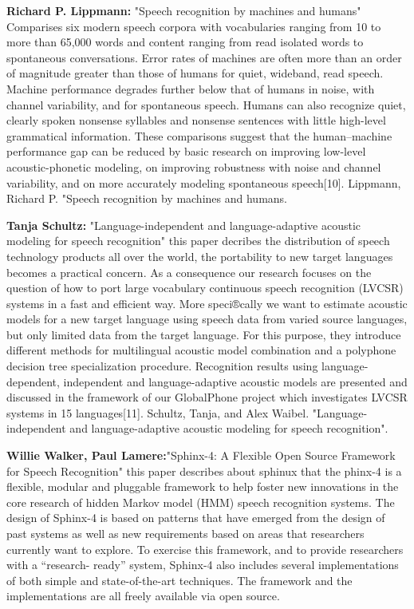 \documentclass[12pt,a4paper,oldfontcommands]{memoir}
\begin{document}
\textbf{Richard P. Lippmann:} "Speech recognition by machines and humans" Comparises six modern speech corpora with vocabularies ranging from 10 to more than 65,000 words and content ranging from read isolated words to spontaneous conversations. Error rates of machines are often more than an order of magnitude greater than those of
humans for quiet, wideband, read speech. Machine performance degrades further below that of humans in noise, with
channel variability, and for spontaneous speech. Humans can also recognize quiet, clearly spoken nonsense syllables and
nonsense sentences with little high-level grammatical information. These comparisons suggest that the human–machine
performance gap can be reduced by basic research on improving low-level acoustic-phonetic modeling, on improving
robustness with noise and channel variability, and on more accurately modeling spontaneous speech[10].  Lippmann, Richard P. "Speech recognition by machines and humans\cite{8}.

\textbf{Tanja Schultz:} "Language-independent and language-adaptive acoustic modeling for speech recognition" this paper decribes  the distribution of speech technology products all over the world, the portability to new target languages
becomes a practical concern. As a consequence our research focuses on the question of how to port large
vocabulary continuous speech recognition (LVCSR) systems in a fast and efficient way. More speci®cally we want
to estimate acoustic models for a new target language using speech data from varied source languages, but only
limited data from the target language. For this purpose, they introduce different methods for multilingual acoustic
model combination and a polyphone decision tree specialization procedure. Recognition results using language-
dependent, independent and language-adaptive acoustic models are presented and discussed in the framework of
our GlobalPhone project which investigates LVCSR systems in 15 languages[11].   Schultz, Tanja, and Alex Waibel. "Language-independent and language-adaptive acoustic modeling for speech recognition"\cite{9}.

\textbf{Willie Walker, Paul Lamere:}"Sphinx-4: A Flexible Open Source Framework for Speech Recognition" this paper describes about sphinux that the phinx-4 is a flexible, modular and pluggable framework to help foster new innovations
in the core research of hidden Markov model (HMM) speech recognition systems. The
design of Sphinx-4 is based on patterns that have emerged from the design of past
systems as well as new requirements based on areas that researchers currently want
to explore. To exercise this framework, and to provide researchers with a “research-
ready” system, Sphinx-4 also includes several implementations of both simple and
state-of-the-art techniques. The framework and the implementations are all freely
available via open source\cite{10}.
\end{document}
